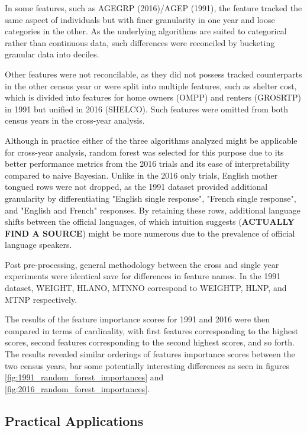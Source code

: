 \documentclass[10pt, conference, compsocconf]{IEEEtran}
\begin{document}
In some features, such as AGEGRP (2016)/AGEP (1991), the feature tracked the same aspect of individuals but with finer granularity in one year and loose categories in the other.  As the underlying algorithms are suited to categorical rather than continuous data, such differences were reconciled by bucketing granular data into deciles.

Other features were not reconcilable, as they did not possess tracked counterparts in the other census year or were split into multiple features, such as shelter cost, which is divided into features for home owners (OMPP) and renters (GROSRTP) in 1991 but unified in 2016 (SHELCO).  Such features were omitted from both census years in the cross-year analysis.

Although in practice either of the three algorithms analyzed might be applicable for cross-year analysis, random forest was selected for this purpose due to its better performance metrics from the 2016 trials and its ease of interpretability compared to naive Bayesian.  Unlike in the 2016 only trials, English mother tongued rows were not dropped, as the 1991 dataset provided additional granularity by differentiating "English single response", "French single response", and "English and French" responses.  By retaining these rows, additional language shifts between the official languages, of which intuition suggests (\textbf{ACTUALLY FIND A SOURCE}) might be more numerous due to the prevalence of official language speakers.

Post pre-processing, general methodology between the cross and single year experiments were identical save for differences in feature names.  In the 1991 dataset, WEIGHT, HLANO, MTNNO correspond to WEIGHTP, HLNP, and MTNP respectively.

The results of the feature importance scores for 1991 and 2016 were then compared in terms of cardinality, with first features corresponding to the highest scores, second features corresponding to the second highest scores, and so forth.  The results revealed similar orderings of features importance scores between the two census years, bar some potentially interesting differences as seen in figures \ref{fig:1991_random_forest_importances} and \ref{fig:2016_random_forest_importances}.

\subsection{Practical Applications}
\end{document}

